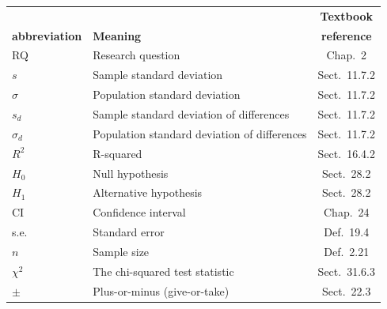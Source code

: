 \documentclass[
  11pt,
  a4paper,
  krantz2]{krantz}
\begin{document}
\begin{table}
\centering\begingroup\fontsize{9}{11}\selectfont

\begin{tabular}{>{\centering\arraybackslash}p{25mm}lc}
\toprule
\multicolumn{1}{c}{\textbf{Symbol or}} & \multicolumn{1}{c}{\textbf{ }} & \multicolumn{1}{c}{\textbf{Textbook}} \\
\textbf{abbreviation} & \textbf{Meaning} & \textbf{reference}\\
\midrule
RQ & Research question & Chap.~2\\
\addlinespace
$s$ & Sample standard deviation & Sect.~11.7.2\\
$\sigma$ & Population standard deviation & Sect.~11.7.2\\
\addlinespace
$s_d$ & Sample standard deviation of differences & Sect.~11.7.2\\
$\sigma_d$ & Population standard deviation of differences & Sect.~11.7.2\\
\addlinespace
$R^2$ & R-squared & Sect.~16.4.2\\
\addlinespace
$H_0$ & Null hypothesis & Sect.~28.2\\
$H_1$ & Alternative hypothesis & Sect.~28.2\\
\addlinespace
CI & Confidence interval & Chap.~24\\
s.e. & Standard error & Def.~19.4\\
$n$ & Sample size & Def.~2.21\\
\addlinespace
$\chi^2$ & The chi-squared test statistic & Sect.~31.6.3\\
$\pm$ & Plus-or-minus (give-or-take) & Sect.~22.3\\
\bottomrule
\end{tabular}
\endgroup{}
\end{table}
\end{document}
